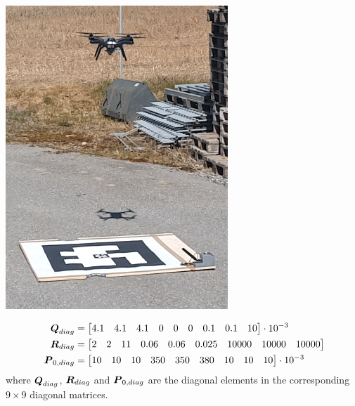 \begin{minipage}[c]{0.3\textwidth}
	\centering
	\includegraphics[width=\textwidth]{img/landingStatic.png}
	\captionsetup{type=figure}
	\label{fig:landingOnStatic}
\end{minipage}

\begin{align}\label{eq:filterParamStaticQ}
	\boldsymbol{Q}_{diag}&=
	\begin{bmatrix}
		 4.1&4.1&4.1&0&0&0&0.1&0.1&10
	\end{bmatrix}\cdot 10^{-3}\\
	\boldsymbol{R}_{diag}&=
	\begin{bmatrix}
		2&2&11&0.06&0.06&0.025&10000&10000&10000
	\end{bmatrix}\\\
	\boldsymbol{P}_{0,diag}&=
	\begin{bmatrix}
		10&10&10&350&350&380&10&10&10
	\end{bmatrix}\cdot 10^{-3}\label{eq:filterParamStaticP}
\end{align}
where $\boldsymbol{Q}_{diag}$, $\boldsymbol{R}_{diag}$ and $\boldsymbol{P}_{0,diag}$ are the diagonal elements in the corresponding $9\times9$ diagonal matrices.

